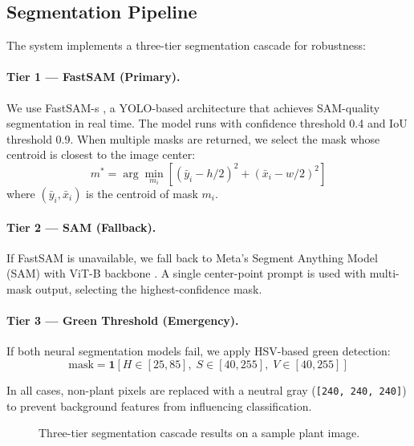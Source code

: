 \documentclass[11pt,a4paper,twocolumn]{article}
\begin{document}
\subsection{Segmentation Pipeline}

The system implements a three-tier segmentation cascade for robustness:

\paragraph{Tier 1 --- FastSAM (Primary).} We use FastSAM-s \cite{zhao2023fastsam}, a YOLO-based architecture that achieves SAM-quality segmentation in real time. The model runs with confidence threshold 0.4 and IoU threshold 0.9. When multiple masks are returned, we select the mask whose centroid is closest to the image center:
\begin{equation}
    m^* = \arg\min_{m_i} \left[ (\bar{y}_i - h/2)^2 + (\bar{x}_i - w/2)^2 \right]
\end{equation}
where $(\bar{y}_i, \bar{x}_i)$ is the centroid of mask $m_i$.

\paragraph{Tier 2 --- SAM (Fallback).} If FastSAM is unavailable, we fall back to Meta's Segment Anything Model (SAM) with ViT-B backbone \cite{kirillov2023sam}. A single center-point prompt is used with multi-mask output, selecting the highest-confidence mask.

\paragraph{Tier 3 --- Green Threshold (Emergency).} If both neural segmentation models fail, we apply HSV-based green detection:
\begin{equation}
    \text{mask} = \mathbf{1}\left[H \in [25, 85],\; S \in [40, 255],\; V \in [40, 255]\right]
\end{equation}

In all cases, non-plant pixels are replaced with a neutral gray (\texttt{[240, 240, 240]}) to prevent background features from influencing classification.

\begin{figure}[H]
    \centering
    \caption{Three-tier segmentation cascade results on a sample plant image.}
    \label{fig:segmentation}
\end{figure}
\end{document}
